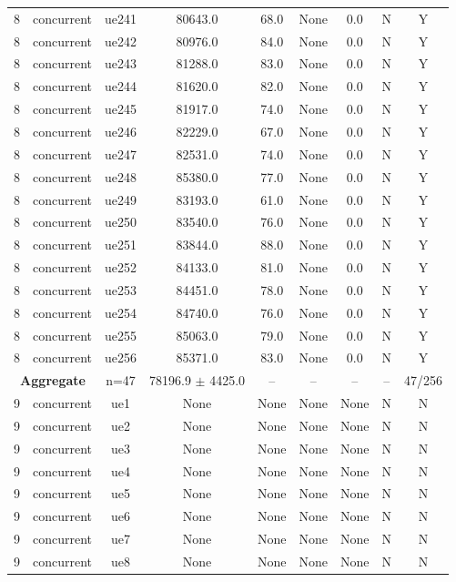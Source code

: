 \begin{table}[ht]
\begin{tabular}{|c|c|c|c|c|c|c|c|c|}
8 & concurrent & ue241 & 80643.0 & 68.0 & None & 0.0 & N & Y \\
8 & concurrent & ue242 & 80976.0 & 84.0 & None & 0.0 & N & Y \\
8 & concurrent & ue243 & 81288.0 & 83.0 & None & 0.0 & N & Y \\
8 & concurrent & ue244 & 81620.0 & 82.0 & None & 0.0 & N & Y \\
8 & concurrent & ue245 & 81917.0 & 74.0 & None & 0.0 & N & Y \\
8 & concurrent & ue246 & 82229.0 & 67.0 & None & 0.0 & N & Y \\
8 & concurrent & ue247 & 82531.0 & 74.0 & None & 0.0 & N & Y \\
8 & concurrent & ue248 & 85380.0 & 77.0 & None & 0.0 & N & Y \\
8 & concurrent & ue249 & 83193.0 & 61.0 & None & 0.0 & N & Y \\
8 & concurrent & ue250 & 83540.0 & 76.0 & None & 0.0 & N & Y \\
8 & concurrent & ue251 & 83844.0 & 88.0 & None & 0.0 & N & Y \\
8 & concurrent & ue252 & 84133.0 & 81.0 & None & 0.0 & N & Y \\
8 & concurrent & ue253 & 84451.0 & 78.0 & None & 0.0 & N & Y \\
8 & concurrent & ue254 & 84740.0 & 76.0 & None & 0.0 & N & Y \\
8 & concurrent & ue255 & 85063.0 & 79.0 & None & 0.0 & N & Y \\
8 & concurrent & ue256 & 85371.0 & 83.0 & None & 0.0 & N & Y \\
\multicolumn{2}{|c|}{\textbf{Aggregate}} & n=47 & 78196.9 $\pm$ 4425.0 & -- & -- & -- & -- & 47/256 \\
\hline
9 & concurrent & ue1 & None & None & None & None & N & N \\
9 & concurrent & ue2 & None & None & None & None & N & N \\
9 & concurrent & ue3 & None & None & None & None & N & N \\
9 & concurrent & ue4 & None & None & None & None & N & N \\
9 & concurrent & ue5 & None & None & None & None & N & N \\
9 & concurrent & ue6 & None & None & None & None & N & N \\
9 & concurrent & ue7 & None & None & None & None & N & N \\
9 & concurrent & ue8 & None & None & None & None & N & N \\

\end{tabular}
\end{table}
